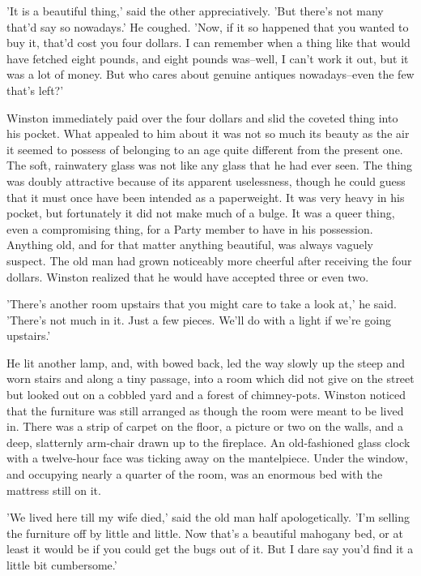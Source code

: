 \documentclass{article}
\begin{document}
'It is a beautiful thing,' said the other appreciatively. 'But there's not
many that'd say so nowadays.' He coughed. 'Now, if it so happened that you
wanted to buy it, that'd cost you four dollars. I can remember when a thing
like that would have fetched eight pounds, and eight pounds was--well, I
can't work it out, but it was a lot of money. But who cares about genuine
antiques nowadays--even the few that's left?'

Winston immediately paid over the four dollars and slid the coveted thing
into his pocket. What appealed to him about it was not so much its beauty
as the air it seemed to possess of belonging to an age quite different
from the present one. The soft, rainwatery glass was not like any glass
that he had ever seen. The thing was doubly attractive because of its
apparent uselessness, though he could guess that it must once have been
intended as a paperweight. It was very heavy in his pocket, but fortunately
it did not make much of a bulge. It was a queer thing, even a compromising
thing, for a Party member to have in his possession. Anything old, and for
that matter anything beautiful, was always vaguely suspect. The old man had
grown noticeably more cheerful after receiving the four dollars. Winston
realized that he would have accepted three or even two.

'There's another room upstairs that you might care to take a look at,' he
said. 'There's not much in it. Just a few pieces. We'll do with a light if
we're going upstairs.'

He lit another lamp, and, with bowed back, led the way slowly up the
steep and worn stairs and along a tiny passage, into a room which did
not give on the street but looked out on a cobbled yard and a forest of
chimney-pots. Winston noticed that the furniture was still arranged as
though the room were meant to be lived in. There was a strip of carpet on
the floor, a picture or two on the walls, and a deep, slatternly arm-chair
drawn up to the fireplace. An old-fashioned glass clock with a twelve-hour
face was ticking away on the mantelpiece. Under the window, and occupying
nearly a quarter of the room, was an enormous bed with the mattress still
on it.

'We lived here till my wife died,' said the old man half apologetically.
'I'm selling the furniture off by little and little. Now that's a beautiful
mahogany bed, or at least it would be if you could get the bugs out of it.
But I dare say you'd find it a little bit cumbersome.'
\end{document}
